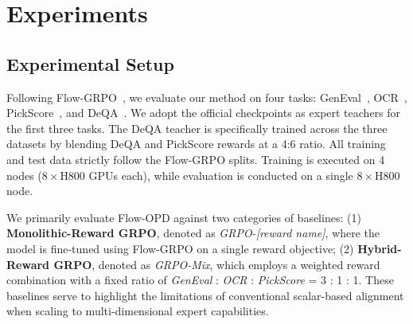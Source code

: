 \section{Experiments}
\subsection{Experimental Setup}
Following Flow-GRPO~\cite{liu2025flow}, we evaluate our method on four tasks: GenEval~\cite{geneval}, OCR~\cite{textdiffuser}, PickScore~\cite{pickscore}, and DeQA~\cite{deqa}. We adopt the official checkpoints as expert teachers for the first three tasks. The DeQA teacher is specifically trained across the three datasets by blending DeQA and PickScore rewards at a 4:6 ratio. All training and test data strictly follow the Flow-GRPO splits. Training is executed on 4 nodes ($8 \times \text{H800}$ GPUs each), while evaluation is conducted on a single $8 \times \text{H800}$ node.

We primarily evaluate Flow-OPD against two categories of baselines: 
(1) \textbf{Monolithic-Reward GRPO}, denoted as \textit{GRPO-[reward name]}, where the model is fine-tuned using Flow-GRPO on a single reward objective; 
(2) \textbf{Hybrid-Reward GRPO}, denoted as \textit{GRPO-Mix}, which employs a weighted reward combination with a fixed ratio of \textit{GenEval} : \textit{OCR} : \textit{PickScore} = 3 : 1 : 1. 
These baselines serve to highlight the limitations of conventional scalar-based alignment when scaling to multi-dimensional expert capabilities.



